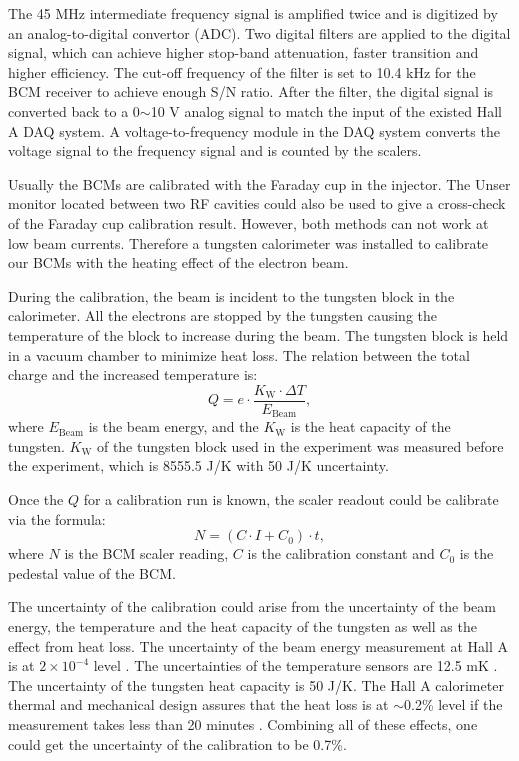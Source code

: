 The 45 MHz intermediate frequency signal is amplified twice and is digitized by an analog-to-digital convertor (ADC). Two digital filters are applied to the digital signal, which can achieve higher stop-band attenuation, faster transition and higher efficiency. The cut-off frequency of the filter is set to 10.4 kHz for the BCM receiver to achieve enough S/N ratio. After the filter, the digital signal is converted back to a 0$\sim$10 V analog signal to match the input of the existed Hall A DAQ system. A voltage-to-frequency module in the DAQ system converts the voltage signal to the frequency signal and is counted by the scalers.

Usually the BCMs are calibrated with the Faraday cup in the injector. The Unser monitor located between two RF cavities could also be used to give a cross-check of the Faraday cup calibration result. However, both methods can not work at low beam currents. Therefore a tungsten calorimeter \cite{Bevins2005} was installed to calibrate our BCMs with the heating effect of the electron beam.

During the calibration, the beam is incident to the tungsten block in the calorimeter. All the electrons are stopped by the tungsten causing the temperature of the block to increase during the beam. The tungsten block is held in a vacuum chamber to minimize heat loss. The relation between the total charge and the increased temperature is:
\begin{equation} \label{C5S2SS2E1}
Q = e\cdot\frac{K_{\mathrm{W}}\cdot\Delta T}{E_{\mathrm{Beam}}},
\end{equation}
where $E_{\mathrm{Beam}}$ is the beam energy, and the $K_{\mathrm{W}}$ is the heat capacity of the tungsten. $K_{\mathrm{W}}$ of the tungsten block used in the experiment was measured before the experiment, which is 8555.5 J/K with 50 J/K uncertainty.

Once the $Q$ for a calibration run is known, the scaler readout could be calibrate via the formula:
\begin{equation} \label{C5S2SS2E2}
N = (C\cdot I+C_0)\cdot t,
\end{equation}
where $N$ is the BCM scaler reading, $C$ is the calibration constant and $C_0$ is the pedestal value of the BCM.

The uncertainty of the calibration could arise from the uncertainty of the beam energy, the temperature and the heat capacity of the tungsten as well as the effect from heat loss. The uncertainty of the beam energy measurement at Hall A is at $2\times10^{-4}$ level \cite{BEAMENERGY}. The uncertainties of the temperature sensors are 12.5 mK \cite{CALORIMETERLEDEX}. The uncertainty of the tungsten heat capacity is 50 J/K. The Hall A calorimeter thermal and mechanical design assures that the heat loss is at $\sim$0.2\% level if the measurement takes less than 20 minutes \cite{Bevins2005}. Combining all of these effects, one could get the uncertainty of the calibration to be 0.7\%.

